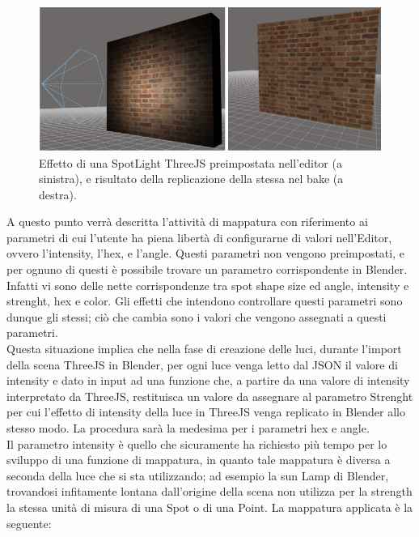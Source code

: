 \\
\begin{figure}[htb]
 \centering
 \includegraphics[width=1\linewidth]{images/chapter_baking_service/ba_se_confronto_spot.png}\hfill
 \caption[SpotLight preimpostata]{Effetto di una SpotLight ThreeJS preimpostata nell'editor (a sinistra), e risultato della replicazione della stessa nel bake (a destra).}
 \label{fig:ba_se_confronto_spot}
\end{figure}
A questo punto verrà descritta l’attività di mappatura con riferimento ai parametri di cui l’utente ha piena libertà di configurarne di valori nell’Editor, ovvero l’intensity, l’hex, e l’angle. Questi parametri non vengono preimpostati, e per ognuno di questi è possibile trovare un parametro corrispondente in Blender.
\\ 
Infatti vi sono delle nette corrispondenze tra spot shape size ed angle, intensity e strenght, hex e color. Gli effetti che intendono controllare questi parametri sono dunque gli stessi; ciò che cambia sono i valori che vengono assegnati a questi parametri.
\\
Questa situazione implica che nella fase di creazione delle luci, durante l’import della scena ThreeJS in Blender, per ogni luce venga letto dal JSON il valore di intensity e dato in input ad una funzione che, a partire da una valore di intensity interpretato da ThreeJS, restituisca un valore da assegnare al parametro Strenght per cui l’effetto di intensity della luce in ThreeJS venga replicato in Blender allo stesso modo. La procedura sarà la medesima per i parametri hex e angle.
\\ 
Il parametro intensity è quello che sicuramente ha richiesto più tempo per lo sviluppo di una funzione di mappatura, in quanto tale mappatura è diversa a seconda della luce che si sta utilizzando; ad esempio la sun Lamp di Blender, trovandosi infitamente lontana dall’origine della scena non utilizza per la strength la stessa unità di misura di una Spot o di una Point. La mappatura applicata è la seguente:
